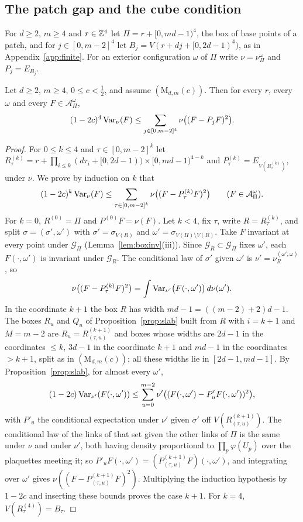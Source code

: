 \subsection{The patch gap and the cube condition}

For $d\ge2$, $m\ge4$ and $r\in\mathbb{Z}^4$ let $\Pi=r+[0,md-1)^4$, the box of
base points of a patch, and for $j\in[0,m-2]^4$ let $B_j=V(r+dj+
[0,2d-1)^4)$, as in Appendix~\ref{app:finite}. For an exterior
configuration $\omega$ of $\Pi$ write $\nu=\nu^\omega_\Pi$ and $P_j=E_{B_j}$.

\begin{theorem}\label{thm:patch}
Let $d\ge2$, $m\ge4$, $0\le c<\frac12$, and assume $(\mathrm M_{d,m}(c))$.
Then for every $r$, every $\omega$ and every $F\in\mathcal A^\omega_\Pi$,
\[
(1-2c)^4\operatorname{Var}_\nu(F)\le\sum_{j\in[0,m-2]^4}\nu\bigl((F-P_jF)^2\bigr).
\]
\end{theorem}

\begin{proof}
For $0\le k\le4$ and $\tau\in[0,m-2]^k$ let $R^{(k)}_\tau=r+\prod_{i\le k}
(d\tau_i+[0,2d-1))\times[0,md-1)^{4-k}$ and $P^{(k)}_\tau=
E_{V(R^{(k)}_\tau)}$, under $\nu$. We prove by induction on $k$ that
\[
(1-2c)^k\operatorname{Var}_\nu(F)\le\sum_{\tau\in[0,m-2]^k}\nu\bigl((F-P^{(k)}_\tau F)^2
\bigr)\qquad(F\in\mathcal A^\omega_\Pi).
\]
For $k=0$, $R^{(0)}=\Pi$ and $P^{(0)}F=\nu(F)$. Let $k<4$, fix $\tau$, write
$R=R^{(k)}_\tau$, and split $\sigma=(\sigma',\omega')$ with $\sigma'=
\sigma_{V(R)}$ and $\omega'=\sigma_{V(\Pi)\setminus V(R)}$. Take $F$
invariant at every point under $\mathcal G_\Pi$ (Lemma~\ref{lem:boxinv}(iii)).
Since $\mathcal G_R\subset\mathcal G_\Pi$ fixes $\omega'$, each
$F(\cdot,\omega')$ is invariant under $\mathcal G_R$. The conditional law of
$\sigma'$ given $\omega'$ is $\nu'=\nu^{(\omega',\omega)}_R$, so
\[
\nu\bigl((F-P^{(k)}_\tau F)^2\bigr)=\int\operatorname{Var}_{\nu'}\bigl(F(\cdot,\omega')
\bigr)\,d\nu(\omega').
\]
In the coordinate $k+1$ the box $R$ has width $md-1=((m-2)+2)d-1$. The
boxes $R_u$ and $Q_u$ of Proposition~\ref{prop:slab} built from $R$ with
$i=k+1$ and $M=m-2$ are $R_u=R^{(k+1)}_{(\tau,u)}$ and boxes whose widths are
$2d-1$ in the coordinates $\le k$, $3d-1$ in the coordinate $k+1$ and $md-1$
in the coordinates $>k+1$, split as in $(\mathrm M_{d,m}(c))$; all these
widths lie in $[2d-1,md-1]$. By Proposition~\ref{prop:slab}, for almost every
$\omega'$,
\[
(1-2c)\operatorname{Var}_{\nu'}(F(\cdot,\omega'))\le\sum_{u=0}^{m-2}\nu'\bigl((F(\cdot,
\omega')-P'_uF(\cdot,\omega'))^2\bigr),
\]
with $P'_u$ the conditional expectation under $\nu'$ given $\sigma'$ off
$V(R^{(k+1)}_{(\tau,u)})$. The conditional law of the links of that set given
the other links of $\Pi$ is the same under $\nu$ and under $\nu'$, both
having density proportional to $\prod_p\varphi(U_p)$ over the plaquettes
meeting it; so $P'_uF(\cdot,\omega')=(P^{(k+1)}_{(\tau,u)}F)(\cdot,\omega')$,
and integrating over $\omega'$ gives $\nu((F-P^{(k+1)}_{(\tau,u)}F)^2)$.
Multiplying the induction hypothesis by $1-2c$ and inserting these bounds
proves the case $k+1$. For $k=4$, $V(R^{(4)}_\tau)=B_\tau$.
\end{proof}

